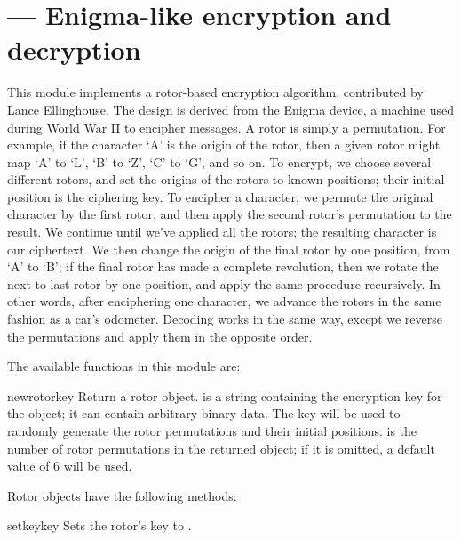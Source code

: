 \section{ ---
         Enigma-like encryption and decryption}



This module implements a rotor-based encryption algorithm, contributed by
Lance Ellinghouse.  The design is derived
from the Enigma device, a machine
used during World War II to encipher messages.  A rotor is simply a
permutation.  For example, if the character `A' is the origin of the rotor,
then a given rotor might map `A' to `L', `B' to `Z', `C' to `G', and so on.
To encrypt, we choose several different rotors, and set the origins of the
rotors to known positions; their initial position is the ciphering key.  To
encipher a character, we permute the original character by the first rotor,
and then apply the second rotor's permutation to the result. We continue
until we've applied all the rotors; the resulting character is our
ciphertext.  We then change the origin of the final rotor by one position,
from `A' to `B'; if the final rotor has made a complete revolution, then we
rotate the next-to-last rotor by one position, and apply the same procedure
recursively.  In other words, after enciphering one character, we advance
the rotors in the same fashion as a car's odometer. Decoding works in the
same way, except we reverse the permutations and apply them in the opposite
order.

The available functions in this module are:

\begin{funcdesc}{newrotor}{key}
Return a rotor object.  is a string containing the encryption key
for the object; it can contain arbitrary binary data. The key will be used
to randomly generate the rotor permutations and their initial positions.
 is the number of rotor permutations in the returned object;
if it is omitted, a default value of 6 will be used.
\end{funcdesc}

Rotor objects have the following methods:

\begin{methoddesc}[rotor]{setkey}{key}
Sets the rotor's key to .
\end{methoddesc}

